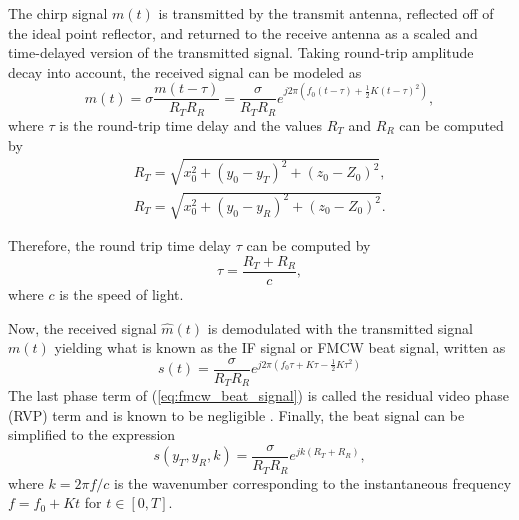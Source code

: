 \documentclass{ieeeaccess}
\begin{document}
The chirp signal $m(t)$ is transmitted by the transmit antenna, reflected off of the ideal point reflector, and returned to the receive antenna as a scaled and time-delayed version of the transmitted signal. Taking round-trip amplitude decay into account, the received signal can be modeled as
\begin{equation}
    \hat{m}(t) = \sigma \frac{m(t-\tau)}{R_T R_R} = \frac{\sigma}{R_T R_R} e^{j2\pi(f_0(t-\tau) + \frac{1}{2}K(t-\tau)^2)},
\end{equation}
where $\tau$ is the round-trip time delay \cite{Yanik:MillimeterWaveNearFieldImaging} and the values $R_T$ and $R_R$ can be computed by
\begin{gather}
    R_T = \sqrt{x_0^2 + (y_0-y_T)^2+(z_0-Z_0)^2}, \\
    R_T = \sqrt{x_0^2 + (y_0-y_R)^2+(z_0-Z_0)^2}.
\end{gather}

Therefore, the round trip time delay $\tau$ can be computed by
\begin{equation}
    \tau = \frac{R_T+R_R}{c},
\end{equation}
where $c$ is the speed of light.

Now, the received signal $\hat{m}(t)$ is demodulated with the transmitted signal $m(t)$ yielding what is known as the IF signal or FMCW beat signal, written as
\begin{equation}
\label{eq:fmcw_beat_signal}
    s(t) = \frac{\sigma}{R_T R_R}e^{j2\pi(f_0\tau +K\tau - \frac{1}{2}K\tau^2)}
\end{equation}
The last phase term of (\ref{eq:fmcw_beat_signal}) is called the residual video phase (RVP) term and is known to be negligible \cite{Yanik:NearFieldMIMOSAR}. Finally, the beat signal can be simplified to the expression
\begin{equation}
\label{eq:fmcw_beat_signal_k_multistatic}
    s(y_T,y_R,k) = \frac{\sigma}{R_T R_R} e^{jk(R_T + R_R)},
\end{equation}
where $k = 2\pi f/c$ is the wavenumber corresponding to the instantaneous frequency $f = f_0 + Kt$ for $t \in [0,T]$.
\end{document}
